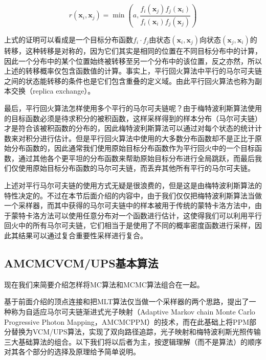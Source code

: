 \begin{equation}
	r(\mathbf{x}_i,\mathbf{x}_j)=\min(a,\frac{f_i(\mathbf{x}_j)f_j(\mathbf{x}_i)}{f_i(\mathbf{x}_i)f_j(\mathbf{x}_j)})
\end{equation}

\noindent 上式的证明可以看成是一个目标分布函数$f_i\cdot f_j$由状态$(\mathbf{x}_i,\mathbf{x}_j)$向状态$(\mathbf{x}_j,\mathbf{x}_i)$的转移，这种转移是对称的，因为它们其实是相同的位置在不同目标分布中的计算，因此一个分布中的某个位置始终被转移至另一个分布中的该位置，反之亦然，所以上述的转移概率仅包含函数值的计算。事实上，平行回火算法中平行的马尔可夫链之间的状态能转移的条件也是它们包含重叠的定义域。由此平行回火算法也称为副本交换（replica exchange）。

最后，平行回火算法怎样使用多个平行的马尔可夫链呢？由于梅特波利斯算法使用的目标函数必须是待求积分的被积函数，这样采样得到的样本分布（马尔可夫链）才是符合该被积函数的分布的，因此梅特波利斯算法可以通过对每个状态的统计计数来对积分进行估计。但是平行回火算法中使用的大多数分布函数却不是正比于原始分布函数的，因此通常我们使用原始目标分布函数作为平行回火中的一个目标函数，通过其他各个更平坦的分布函数来帮助原始目标分布进行全局跳跃，而最后我们仅使用原始目标分布函数的马尔可夫链，而丢弃其他所有平行的马尔可夫链。

上述对平行马尔可夫链的使用方式无疑是很浪费的，但是这是由梅特波利斯算法的特性决定的。不过在本节后面介绍的内容中，由于我们仅仅把梅特波利斯算法当做一个采样器，而其中获得的马尔可夫链中的样本被用于传统的蒙特卡洛方法中，由于蒙特卡洛方法可以使用任意分布对一个函数进行估计，这使得我们可以利用平行回火中的所有马尔可夫链，它们相当于是使用了不同的概率密度函数进行采样，因此其结果可以通过复合重要性采样进行复合。




\subsection{AMCMCVCM/UPS基本算法}
现在我们来简要介绍怎样将MC算法和MCMC算法组合在一起。

基于前面介绍的顶点连接和把MLT算法仅当做一个采样器的两个思路，\cite{a:RobustAdaptivePhotonTracingusingPhotonPathVisibility}提出了一种称为自适应马尔可夫链渐进式光子映射（Adaptive Markov chain Monte Carlo Progressive Photon Mapping，AMCMCPPM）的技术，而\cite{a:RobustLightTransportSimulationviaMetropolisedBidirectionalEstimators}在此基础上将PPM部分替换为VCM/UPS算法，实现了双向路径追踪，光子映射和梅特波利斯光照传输三大基础算法的组合。以下我们将以后者为主，按逻辑理解（而不是算法）的顺序对其各个部分的选择及原理给予简单说明。




